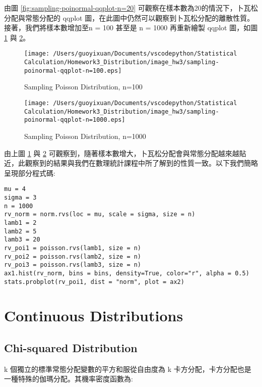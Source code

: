 由圖 \ref{fig:sampling-poinormal-qqplot-n=20} 可觀察在樣本數為20的情況下，卜瓦松分配與常態分配的 qqplot 圖，在此圖中仍然可以觀察到卜瓦松分配的離散性質。接著，我們將樣本數增加至n = 100 甚至是 n = 1000 再重新繪製 qqplot 圖，如圖 \ref{fig:sampling-poinormal-qqplot-n=100} 與 \ref{fig:sampling-poinormal-qqplot-n=1000}。

\begin{figure}[H]
    \centering
        \texttt{[image: /Users/guoyixuan/Documents/vscodepython/Statistical Calculation/Homework3\_Distribution/image\_hw3/sampling-poinormal-qqplot-n=100.eps]}
    \caption{Sampling Poisson Distribution, n=100}
    \label{fig:sampling-poinormal-qqplot-n=100}
\end{figure}

\begin{figure}[H]
    \centering
        \texttt{[image: /Users/guoyixuan/Documents/vscodepython/Statistical Calculation/Homework3\_Distribution/image\_hw3/sampling-poinormal-qqplot-n=1000.eps]}
    \caption{Sampling Poisson Distribution, n=1000}
    \label{fig:sampling-poinormal-qqplot-n=1000}
\end{figure}

由上圖 \ref{fig:sampling-poinormal-qqplot-n=100} 與 \ref{fig:sampling-poinormal-qqplot-n=1000} 可觀察到，隨著樣本數增大，卜瓦松分配會與常態分配越來越貼近，此觀察到的結果與我們在數理統計課程中所了解到的性質一致。以下我們簡略呈現部分程式碼:

\bigskip
\begin{lstlisting}
mu = 4
sigma = 3
n = 1000
rv_norm = norm.rvs(loc = mu, scale = sigma, size = n)
lamb1 = 2
lamb2 = 5
lamb3 = 20
rv_poi1 = poisson.rvs(lamb1, size = n)
rv_poi2 = poisson.rvs(lamb2, size = n)
rv_poi3 = poisson.rvs(lamb3, size = n)
ax1.hist(rv_norm, bins = bins, density=True, color="r", alpha = 0.5)
stats.probplot(rv_poi1, dist = "norm", plot = ax2)
\end{lstlisting}


\section{Continuous Distributions}

\subsection{Chi-squared Distribution}

k 個獨立的標準常態分配變數的平方和服從自由度為 k 卡方分配，卡方分配也是一種特殊的伽瑪分配。其機率密度函數為:

